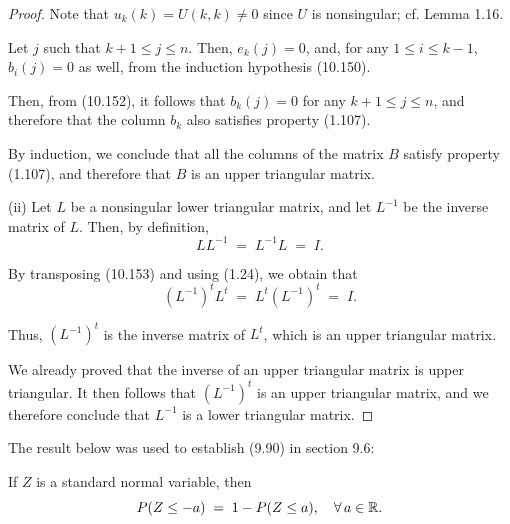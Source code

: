 \begin{proof}
Note that $u_k(k) = U(k,k) \ne 0$ since $U$ is nonsingular; cf. Lemma 1.16.

Let $j$ such that $k+1 \le j \le n$. Then, $e_k(j) = 0$, and, for any $1 \le i \le
k-1$, $b_i(j) = 0$ as well, from the induction hypothesis (10.150).

Then, from (10.152), it follows that $b_k(j) = 0$ for any $k+1 \le j \le n$, and
therefore that the column $b_k$ also satisfies property (1.107).

By induction, we conclude that all the columns of the matrix $B$ satisfy property
(1.107), and therefore that $B$ is an upper triangular matrix.

(ii) Let $L$ be a nonsingular lower triangular matrix, and let $L^{-1}$ be the
inverse matrix of $L$. Then, by definition,
\begin{equation}
LL^{-1} \;=\; L^{-1}L \;=\; I.
\end{equation}

By transposing (10.153) and using (1.24), we obtain that
\[
(L^{-1})^tL^t \;=\; L^t(L^{-1})^t \;=\; I.
\]

Thus, $(L^{-1})^t$ is the inverse matrix of $L^t$, which is an upper triangular
matrix.

We already proved that the inverse of an upper triangular matrix is upper
triangular. It then follows that $(L^{-1})^t$ is an upper triangular matrix, and we
therefore conclude that $L^{-1}$ is a lower triangular matrix.
\end{proof}

The result below was used to establish (9.90) in section 9.6:

\begin{lemma}
If $Z$ is a standard normal variable, then
\[
P(Z \le -a) \;=\; 1 - P(Z \le a), \quad \forall\, a \in \mathbb{R}.
\]
\end{lemma}

